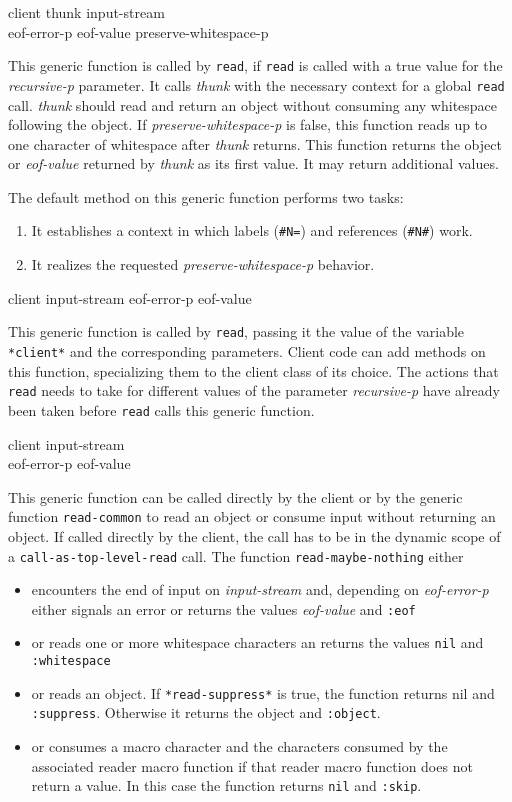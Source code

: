  {client thunk input-stream\\
  eof-error-p eof-value preserve-whitespace-p}

This generic function is called by \texttt{read}, if \texttt{read} is
called with a true value for the \textit{recursive-p} parameter.  It
calls \textit{thunk} with the necessary context for a global
\texttt{read} call.  \textit{thunk} should read and return an object
without consuming any whitespace following the object.  If
\textit{preserve-whitespace-p} is false, this function reads up to one
character of whitespace after \textit{thunk} returns.  This function
returns the object or \textit{eof-value} returned by \textit{thunk} as
its first value.  It may return additional values.

The default method on this generic function performs two tasks:
\begin{enumerate}
\item It establishes a context in which labels (\texttt{\#N=}) and
  references (\texttt{\#N\#}) work.
\item It realizes the requested \textit{preserve-whitespace-p}
  behavior.
\end{enumerate}

 {client input-stream eof-error-p eof-value}

This generic function is called by \texttt{read}, passing it the value
of the variable \texttt{*client*} and the corresponding parameters.
Client code can add methods on this function, specializing them to the
client class of its choice.  The actions that \texttt{read} needs to
take for different values of the parameter \textit{recursive-p} have
already been taken before \texttt{read} calls this generic function.

 {client input-stream\\
  eof-error-p eof-value}

This generic function can be called directly by the client or by the
generic function \texttt{read-common} to read an object or consume
input without returning an object.  If called directly by the client,
the call has to be in the dynamic scope of a
\texttt{call-as-top-level-read} call.  The function
\texttt{read-maybe-nothing} either
\begin{itemize}
\item encounters the end of input on \textit{input-stream} and,
  depending on \textit{eof-error-p} either signals an error or returns
  the values \textit{eof-value} and \texttt{:eof}
\item or reads one or more whitespace characters an returns the values
  \texttt{nil} and \texttt{:whitespace}
\item or reads an object.  If \texttt{*read-suppress*} is true, the
  function returns nil and \texttt{:suppress}.  Otherwise it returns
  the object and \texttt{:object}.
\item or consumes a macro character and the characters consumed by the
  associated reader macro function if that reader macro function does
  not return a value.  In this case the function returns \texttt{nil}
  and \texttt{:skip}.
\end{itemize}

